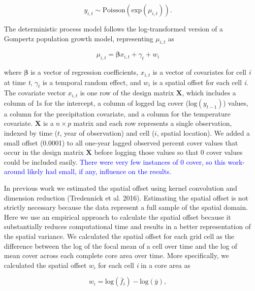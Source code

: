 \documentclass[
  12pt,
]{article}
\begin{document}
\begin{equation}
y_{i,t} \sim \text{Poisson}(\text{exp}(\mu_{i,t})).
\end{equation}

\noindent{}The deterministic process model follows the log-transformed version of a Gompertz population growth model, representing \(\mu_{i,t}\) as

\begin{equation}
\label{eq:regression}
\mu_{i,t} = \bm{\beta} x_{i,t} + \gamma_{t} + w_{i}
\end{equation}

\noindent{}where \(\bm{\beta}\) is a vector of regression coefficients, \(x_{i,t}\) is a vector of covariates for cell \emph{i} at time \emph{t}, \(\gamma_{t}\) is a temporal random effect, and \(w_i\) is a spatial offset for each cell \emph{i}.
The covariate vector \(x_{i,t}\) is one row of the design matrix \(\textbf{X}\), which includes a column of 1s for the intercept, a column of logged lag cover (\(\text{log}(y_{t-1})\)) values, a column for the precipitation covariate, and a column for the temperature covariate.
\(\textbf{X}\) is a \(n \times p\) matrix and each row represents a single observation, indexed by time (\(t\), year of observation) and cell (\(i\), spatial location).
We added a small offset (0.0001) to all one-year lagged observed percent cover values that occur in the design matrix \(\textbf{X}\) before logging those values so that 0 cover values could be included easily.
\textcolor{blue}{There were very few instances of 0 cover, so this work-around likely had small, if any, influence on the results.}

In previous work we estimated the spatial offset using kernel convolution and dimension reduction (Tredennick et al. 2016).
Estimating the spatial offset is not strictly necessary because the data represent a full sample of the spatial domain.
Here we use an empirical approach to calculate the spatial offset because it substantially reduces computational time and results in a better representation of the spatial variance.
We calculated the spatial offset for each grid cell as the difference between the log of the focal mean of a cell over time and the log of mean cover across each complete core area over time. More specifically, we calculated the spatial offset \(w_i\) for each cell \emph{i} in a core area as

\begin{equation}
w_{i} = {\text{log}(\bar{f}_{i}) - \text{log}(\bar{y})},
\end{equation}
\end{document}
